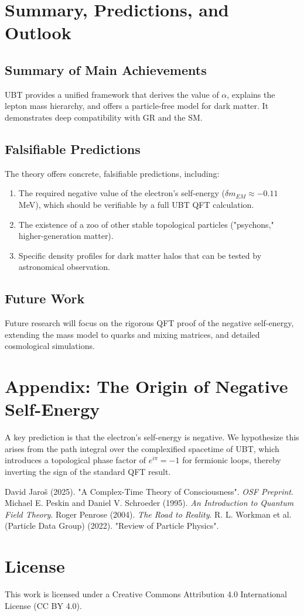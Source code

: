 \documentclass[12pt, a4paper]{article}
\begin{document}
\section{Summary, Predictions, and Outlook}
\subsection{Summary of Main Achievements}
UBT provides a unified framework that derives the value of \( \alpha \), explains the lepton mass hierarchy, and offers a particle-free model for dark matter. It demonstrates deep compatibility with GR and the SM.

\subsection{Falsifiable Predictions}
The theory offers concrete, falsifiable predictions, including:
\begin{enumerate}
    \item The required negative value of the electron's self-energy (\( \delta m_{EM} \approx -0.11 \) MeV), which should be verifiable by a full UBT QFT calculation.
    \item The existence of a zoo of other stable topological particles ("psychons," higher-generation matter).
    \item Specific density profiles for dark matter halos that can be tested by astronomical observation.
\end{enumerate}

\subsection{Future Work}
Future research will focus on the rigorous QFT proof of the negative self-energy, extending the mass model to quarks and mixing matrices, and detailed cosmological simulations.

\appendix
\section{Appendix: The Origin of Negative Self-Energy}
A key prediction is that the electron's self-energy is negative. We hypothesize this arises from the path integral over the complexified spacetime of UBT, which introduces a topological phase factor of \( e^{i\pi} = -1 \) for fermionic loops, thereby inverting the sign of the standard QFT result.

\begin{thebibliography}{9}
     David Jaroš (2025). "A Complex-Time Theory of Consciousness". \textit{OSF Preprint}.
     Michael E. Peskin and Daniel V. Schroeder (1995). \textit{An Introduction to Quantum Field Theory}.
     Roger Penrose (2004). \textit{The Road to Reality}.
     R. L. Workman et al. (Particle Data Group) (2022). "Review of Particle Physics".
\end{thebibliography}

\section*{License}
This work is licensed under a Creative Commons Attribution 4.0 International License (CC BY 4.0).
\end{document}
